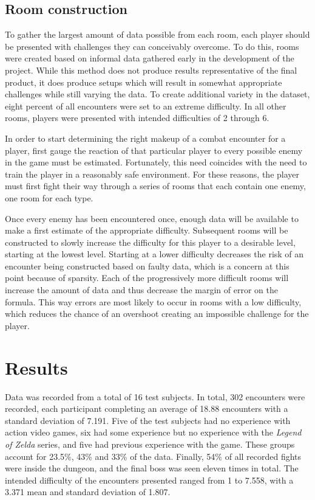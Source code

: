 \documentclass[a4paper]{article}
\begin{document}
\begin{multicols*}{2}
\subsection{Room construction} \label{roomconstruction}
To gather the largest amount of data possible from each room, each player should be presented with challenges they can conceivably overcome. To do this, rooms were created based on informal data gathered early in the development of the project. While this method does not produce results representative of the final product, it does produce setups which will result in somewhat appropriate challenges while still varying the data. To create additional variety in the dataset, eight percent of all encounters were set to an extreme difficulty. In all other rooms, players were presented with intended difficulties of 2 through 6.

In order to start determining the right makeup of a combat encounter for a player, first gauge the reaction of that particular player to every possible enemy in the game must be estimated. Fortunately, this need coincides with the need to train the player in a reasonably safe environment. For these reasons, the player must first fight their way through a series of rooms that each contain one enemy, one room for each type. 

Once every enemy has been encountered once, enough data will be available to make a first estimate of the appropriate difficulty. Subsequent rooms will be constructed to slowly increase the difficulty for this player to a desirable level, starting at the lowest level. Starting at a lower difficulty decreases the risk of an encounter being constructed based on faulty data, which is a concern at this point because of sparsity. Each of the progressively more difficult rooms will increase the amount of data and thus decrease the margin of error on the formula. This way errors are most likely to occur in rooms with a low difficulty, which reduces the chance of an overshoot creating an impossible challenge for the player.

\section{Results} \label{results}
Data was recorded from a total of 16 test subjects. In total, 302 encounters were recorded, each participant completing an average of 18.88 encounters with a standard deviation of 7.191. Five of the test subjects had no experience with action video games, six had some experience but no experience with the \emph{Legend of Zelda} series, and five had previous experience with the game. These groups account for 23.5\%, 43\% and 33\% of the data. Finally, 54\% of all recorded fights were inside the dungeon, and the final boss was seen eleven times in total. The intended difficulty of the encounters presented ranged from 1 to 7.558, with a 3.371 mean and standard deviation of 1.807.


\end{multicols*}
\end{document}
